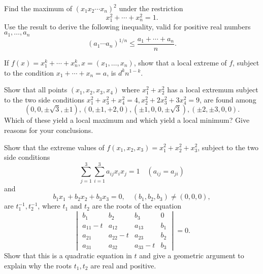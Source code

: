 \begin{problembox}
Find the maximum of \((x_1 x_2 \cdots x_n)^2\) under the restriction
\[ x_1^2 + \cdots + x_n^2 = 1. \]
Use the result to derive the following inequality, valid for positive real numbers \(a_1, \ldots, a_n\)
\[ (a_1 \cdots a_n)^{1/n} \leq \frac{a_1 + \cdots + a_n}{n}. \]
\end{problembox}

\begin{problembox}
If \(f(x) = x_1^k + \cdots + x_n^k, x = (x_1, \ldots, x_n)\), show that a local extreme of \(f\), subject to the condition \(x_1 + \cdots + x_n = a\), is \(d^k n^{1-k}\).
\end{problembox}

\begin{problembox}
Show that all points \((x_1, x_2, x_3, x_4)\) where \(x_1^2 + x_2^2\) has a local extremum subject to the two side conditions \(x_1^2 + x_3^2 + x_4^2 = 4, x_2^2 + 2x_3^2 + 3x_4^2 = 9\), are found among 
\[ (0, 0, \pm \sqrt{3}, \pm 1), (0, \pm 1, +2, 0), (\pm 1, 0, 0, \pm \sqrt{3}), (\pm 2, \pm 3, 0, 0). \]
Which of these yield a local maximum and which yield a local minimum? Give reasons for your conclusions.
\end{problembox}

\begin{problembox}
Show that the extreme values of \(f(x_1, x_2, x_3) = x_1^2 + x_2^2 + x_3^2\), subject to the two side conditions
\[ \sum_{j=1}^3 \sum_{i=1}^3 a_{ij} x_i x_j = 1 \quad (a_{ij} = a_{ji}) \]
and
\[ b_1 x_1 + b_2 x_2 + b_3 x_3 = 0, \quad (b_1, b_2, b_3) \neq (0, 0, 0), \]
are \(t_1^{-1}, t_2^{-1}\), where \(t_1\) and \(t_2\) are the roots of the equation
\[\begin{vmatrix}
b_1 & b_2 & b_3 & 0 \\
a_{11} - t & a_{12} & a_{13} & b_1 \\
a_{21} & a_{22} - t & a_{23} & b_2 \\
a_{31} & a_{32} & a_{33} - t & b_3
\end{vmatrix} = 0.\]
Show that this is a quadratic equation in \(t\) and give a geometric argument to explain why the roots \(t_1, t_2\) are real and positive.
\end{problembox}

